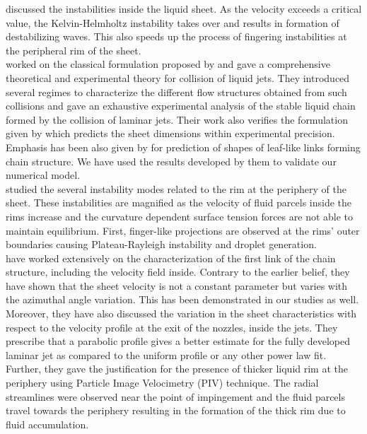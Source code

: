\citet{clanet2002life,villermaux2002life} discussed the instabilities inside the liquid sheet. As the velocity exceeds a critical value, the Kelvin-Helmholtz instability takes over and results in formation of destabilizing waves. This also speeds up the process of fingering instabilities at the peripheral rim of the sheet.\\
\citet{bush2004collision} worked on the classical formulation proposed by \citet{taylor1960formation} and gave a comprehensive theoretical and experimental theory for collision of liquid jets. They introduced several regimes to characterize the different flow structures obtained from such collisions and gave an exhaustive experimental analysis of the stable liquid chain formed by the collision of laminar jets. Their work also verifies the formulation given by \citet{taylor1960formation} which predicts the sheet dimensions within experimental precision. Emphasis has been also given by \citet{bush2004collision} for prediction of shapes of leaf-like links forming chain structure. We have used the results developed by them to validate our numerical model.\\
\citet{bremond2006atomization} studied the several instability modes related to the rim at the periphery of the sheet. These instabilities are magnified as the velocity of fluid parcels inside the rims increase and the curvature dependent surface tension forces are not able to maintain equilibrium. First, finger-like projections are observed at the rims' outer boundaries causing Plateau-Rayleigh instability and droplet generation.\\
\citet{choo2001parametric,choo2002velocity,choo2007effect} have worked extensively on the characterization of the first link of the chain structure, including the velocity field inside. Contrary to the earlier belief, they have shown that the sheet velocity is not a constant parameter but varies with the azimuthal angle variation. This has been demonstrated in our studies as well. Moreover, they have also discussed the variation in the sheet characteristics with respect to the velocity profile at the exit of the nozzles, inside the jets. They prescribe that a parabolic profile gives a better estimate for the fully developed laminar jet as compared to the uniform profile or any other power law fit. Further, they gave the justification for the presence of thicker liquid rim at the periphery using Particle Image Velocimetry (PIV) technique. The radial streamlines were observed near the point of impingement and the fluid parcels travel towards the periphery resulting in the formation of the thick rim due to fluid accumulation. \\
